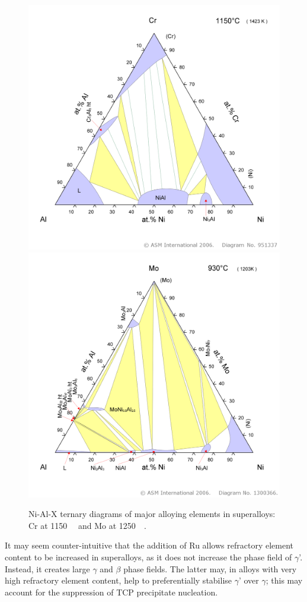 %
\begin{figure}[H]
\begin{center}
\includegraphics[width=11.5cm]{NiAlCr1150}
\includegraphics[width=11.5cm]{NiAlMo930}
\caption{Ni-Al-X ternary diagrams of major alloying elements in superalloys: Cr at 1150\celsius\ ~\cite{oforka85} and Mo at 1250\celsius\ ~\cite{kubaschewski93}.}
\label{fig:SLiii}
\end{center}
\end{figure}
%

It may seem counter-intuitive that the addition of Ru allows refractory element content to be increased in superalloys, as it does not increase the phase field of $\gamma$'.  Instead, it creates large $\gamma$ and $\beta$ phase fields.  The latter may, in alloys with very high refractory element content, help to preferentially stabilise $\gamma$' over $\gamma$; this may account for the suppression of TCP precipitate nucleation.


